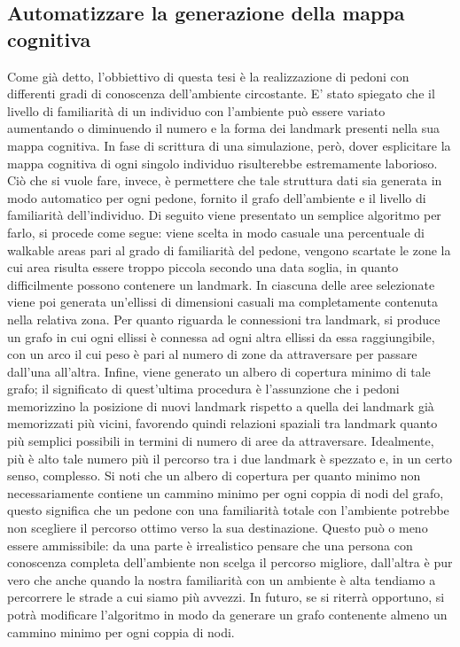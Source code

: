 \documentclass[12pt,a4paper,openright,oneside]{book}
\begin{document}
\subsection{Automatizzare la generazione della mappa cognitiva}
\label{automatic-generation-cognitive-map}
Come già detto, l'obbiettivo di questa tesi è la realizzazione di pedoni con differenti gradi di conoscenza dell'ambiente circostante. E' stato spiegato che il livello di familiarità di un individuo con l'ambiente può essere variato aumentando o diminuendo il numero e la forma dei landmark presenti nella sua mappa cognitiva. In fase di scrittura di una simulazione, però, dover esplicitare la mappa cognitiva di ogni singolo individuo risulterebbe estremamente laborioso. Ciò che si vuole fare, invece, è permettere che tale struttura dati sia generata in modo automatico per ogni pedone, fornito il grafo dell'ambiente e il livello di familiarità dell'individuo. Di seguito viene presentato un semplice algoritmo per farlo, si procede come segue: viene scelta in modo casuale una percentuale di walkable areas pari al grado di familiarità del pedone, vengono scartate le zone la cui area risulta essere troppo piccola secondo una data soglia, in quanto difficilmente possono contenere un landmark. In ciascuna delle aree selezionate viene poi generata un'ellissi di dimensioni casuali ma completamente contenuta nella relativa zona. Per quanto riguarda le connessioni tra landmark, si produce un grafo in cui ogni ellissi è connessa ad ogni altra ellissi da essa raggiungibile, con un arco il cui peso è pari al numero di zone da attraversare per passare dall'una all'altra. Infine, viene generato un albero di copertura minimo di tale grafo; il significato di quest'ultima procedura è l'assunzione che i pedoni memorizzino la posizione di nuovi landmark rispetto a quella dei landmark già memorizzati più vicini, favorendo quindi relazioni spaziali tra landmark quanto più semplici possibili in termini di numero di aree da attraversare. Idealmente, più è alto tale numero più il percorso tra i due landmark è spezzato e, in un certo senso, complesso. Si noti che un albero di copertura per quanto minimo non necessariamente contiene un cammino minimo per ogni coppia di nodi del grafo, questo significa che un pedone con una familiarità totale con l'ambiente potrebbe non scegliere il percorso ottimo verso la sua destinazione. Questo può o meno essere ammissibile: da una parte è irrealistico pensare che una persona con conoscenza completa dell'ambiente non scelga il percorso migliore, dall'altra è pur vero che anche quando la nostra familiarità con un ambiente è alta tendiamo a percorrere le strade a cui siamo più avvezzi. In futuro, se si riterrà opportuno, si potrà modificare l'algoritmo in modo da generare un grafo contenente almeno un cammino minimo per ogni coppia di nodi.
\end{document}
